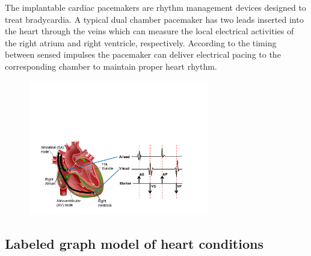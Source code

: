 The implantable cardiac pacemakers are rhythm management devices designed to treat bradycardia. A typical dual chamber pacemaker has two leads inserted into the heart through the veins which can measure the local electrical activities of the right atrium and right ventricle, respectively. According to the timing between sensed impulses the pacemaker can deliver electrical pacing to the corresponding chamber to maintain proper heart rhythm.
\begin{figure}[!t]
	\centering
	\includegraphics[width=0.7\textwidth]{figs/egm.pdf}
	
	\caption{\small }
	\label{fig:probes}
\end{figure} 

\subsection{Labeled graph model of heart conditions}
\label{labeledGraph}

